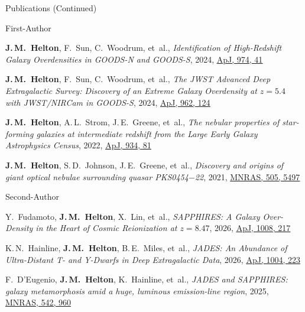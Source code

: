 \documentclass{JMH_CV}
\begin{document}
\begin{rSection}{Publications (Continued)}
\begin{rSubsection}{First-Author}{}{}{}
\begin{etaremune}
    \item \textbf{J.\,M.~Helton}, F.~Sun, C.~Woodrum, et~al., \textit{Identification of High-Redshift Galaxy Overdensities in GOODS-N and GOODS-S}, 2024, \href{https://www.scixplorer.org/abs/2024ApJ...974...41H/abstract}{\ul{ApJ, 974, 41}}
    
    \item \textbf{J.\,M.~Helton}, F.~Sun, C.~Woodrum, et~al., \textit{The JWST Advanced Deep \mbox{Extragalactic} Survey: Discovery of an Extreme Galaxy Overdensity at $\mathit{z = 5.4}$ with JWST/NIRCam in GOODS-S}, 2024, \href{https://www.scixplorer.org/abs/2024ApJ...962..124H/abstract}{\ul{ApJ, 962, 124}}
    
    \item \textbf{J.\,M.~Helton}, A.\,L.~Strom, J.\,E.~Greene, et~al., \textit{The nebular properties of star-forming galaxies at intermediate redshift from the Large Early Galaxy Astrophysics Census}, 2022, \href{https://www.scixplorer.org/abs/2022ApJ...934...81H/abstract}{\ul{ApJ, 934, 81}}
    
    \item \textbf{J.\,M.~Helton}, S.\,D.~Johnson, J.\,E.~Greene, et~al., \textit{Discovery and origins of giant optical nebulae surrounding quasar PKS0454$\mathit{-}$22}, 2021, \href{https://www.scixplorer.org/abs/2021MNRAS.505.5497H/abstract}{\ul{MNRAS, 505, 5497}}

\end{etaremune}
\end{rSubsection}


\begin{rSubsection}{Second-Author}{}{}{}
\begin{etaremune}

    \item Y.~Fudamoto, \textbf{J.\,M.~Helton}, X.~Lin, et~al., \textit{SAPPHIRES: A Galaxy Over-Density in the Heart of Cosmic Reionization at $\mathit{z = 8.47}$}, 2026, \href{https://www.scixplorer.org/abs/2026ApJ..1008..217F/abstract}{\ul{ApJ, 1008, 217}}

    \item K.\,N.~Hainline, \textbf{J.\,M.~Helton}, B.\,E.~Miles, et~al., \textit{JADES: An Abundance of Ultra-Distant T- and Y-Dwarfs in Deep Extragalactic Data}, 2026, \href{https://www.scixplorer.org/abs/2026ApJ..1004..223H/abstract}{\ul{ApJ, 1004, 223}}

    \item F.~D'Eugenio, \textbf{J.\,M.~Helton}, K.~Hainline, et~al., \textit{JADES and SAPPHIRES: galaxy metamorphosis amid a huge, luminous emission-line region}, 2025, \href{https://www.scixplorer.org/abs/2025MNRAS.542..960D/abstract}{\ul{MNRAS, 542, 960}}


\end{etaremune}
\end{rSubsection}
\end{rSection}
\end{document}
